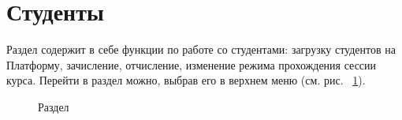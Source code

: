 \graphicspath{ {images/student/} }

\section{Студенты}

Раздел  содержит в себе функции по работе со студентами: загрузку студентов на Платформу, зачисление, 
отчисление, изменение режима прохождения сессии курса. Перейти в раздел можно, выбрав его в верхнем меню 
(см. рис. ~\ref{img:student:top_menu}).
\begin{figure}[H]
	\caption{Раздел }
	\label{img:student:top_menu}
\end{figure}


